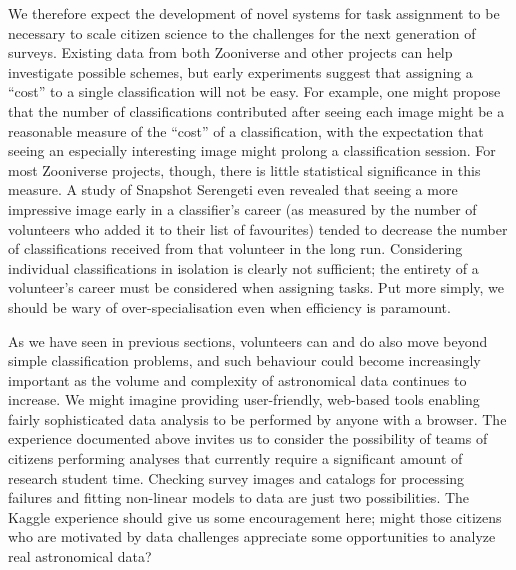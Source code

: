 \documentclass{ar2e}
\begin{document}
We therefore expect the development of novel systems for task assignment to be
necessary to scale citizen science to the challenges for the next generation of
surveys. Existing data from both Zooniverse and other projects can help
investigate possible schemes, but early experiments suggest that assigning a
``cost'' to a single classification will not be easy. For example, one might
propose that the number of classifications contributed after seeing each image
might be a reasonable measure of the ``cost'' of a classification, with the
expectation that seeing an especially interesting image might prolong a
classification session. For most Zooniverse projects, though, there is little
statistical significance in this measure. A study of Snapshot Serengeti even
revealed that seeing a more impressive image early in a classifier's career (as
measured by the number of volunteers who added it to their list of favourites)
tended to decrease the number of classifications received from that volunteer in
the long run. Considering individual classifications in isolation is clearly not
sufficient; the entirety of a volunteer's career must be considered when
assigning tasks. Put more simply, we should be wary of over-specialisation even
when efficiency is paramount. 





As we have seen in previous sections, volunteers can and do also move beyond
simple classification problems, and such behaviour could become increasingly
important as the volume and complexity of astronomical data continues to
increase.  We might imagine providing user-friendly, web-based tools enabling 
fairly sophisticated data analysis to be performed by anyone with a browser.
The experience documented above invites us to consider the possibility of
teams of citizens  performing analyses that currently require a significant
amount of research student time. Checking survey images and catalogs  for
processing failures and fitting non-linear models to data are just two
possibilities. The Kaggle experience should give us some encouragement here;
might those citizens who are motivated by data challenges appreciate some
opportunities to analyze real astronomical data?
\end{document}
